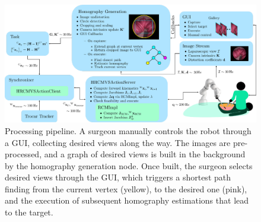\begin{figure}[tb]
\centering
\includegraphics[width=\textwidth]{img/h_rcm_vs_pipeline_real_view.pdf}
\caption{Processing pipeline. A surgeon manually controls the robot through a GUI, collecting desired views along the way. The images are pre-processed, and a graph of desired views is built in the background by the homography generation node. Once built, the surgeon selects desired views through the GUI, which triggers a shortest path finding from the current vertex (yellow), to the desired one (pink), and the execution of subsequent homography estimations that lead to the target.}
\label{c2:fig:pipe}
\end{figure}

